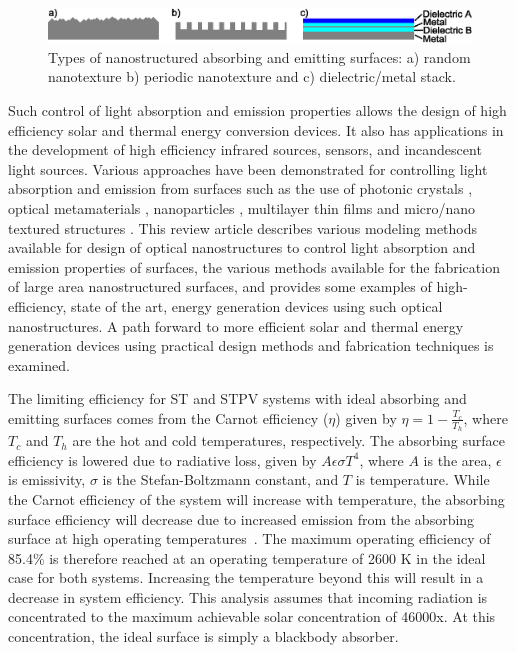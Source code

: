 \documentclass[review]{elsarticle}
\begin{document}
\begin{figure}[ht]
	\includegraphics[width=1\textwidth]{gfig_surfs}
	\caption{\label{gfig_surfs} Types of nanostructured absorbing and 
emitting surfaces: a) random nanotexture b) periodic nanotexture and c) dielectric/metal stack.} 
\end{figure}

Such control of light absorption and emission properties allows the design of high efficiency solar and thermal energy conversion devices. It also has applications in the development of 
high efficiency infrared sources, sensors, and incandescent light sources. 
Various approaches have been demonstrated for controlling light absorption and emission 
from surfaces such as the use of photonic crystals \cite{g11,NYL_SEMSC_2014,g13,g14}, 
optical metamaterials \cite{g15,g16,g17}, nanoparticles \cite{g18,g19,g20,g21}, 
multilayer thin films \cite{g22,RF_OptExp_2009} and micro/nano textured 
structures \cite{g25,g26,g27,g28}.  This review article describes various modeling methods 
available for design of optical nanostructures to control light absorption and emission properties of surfaces, the various methods available for the fabrication of large area nanostructured surfaces, and provides some examples of high-efficiency, state of the art, energy generation devices using such optical nanostructures.  A path forward to more efficient solar and thermal energy generation devices using practical design methods and fabrication techniques is examined.

The limiting efficiency for ST and STPV systems with ideal absorbing and emitting surfaces comes from the Carnot efficiency ($\eta$) 
given by $\eta = 1 - \frac{T_c}{T_h}$, where $T_c$ and $T_h$ are the hot and cold temperatures, respectively. The absorbing 
surface efficiency is lowered due to radiative loss, 
given by $ A \epsilon \sigma T^4$, where $A$ is the area, $\epsilon$ is emissivity, $\sigma$ is the Stefan-Boltzmann constant, and $T$ is temperature.  
While the Carnot efficiency of the system will increase with temperature, the absorbing surface efficiency will decrease due to 
increased emission from the absorbing surface at high operating temperatures~\cite{L_AIP_2007}.  The maximum operating efficiency 
of 85.4\% is therefore reached at an operating temperature of 2600 K in the ideal case for both systems.  Increasing 
the temperature beyond this will result in a decrease in system efficiency.  This analysis assumes that incoming 
radiation is concentrated to the maximum achievable solar concentration of 46000x.  At this concentration, the 
ideal surface is simply a blackbody absorber.
 
\end{document}
